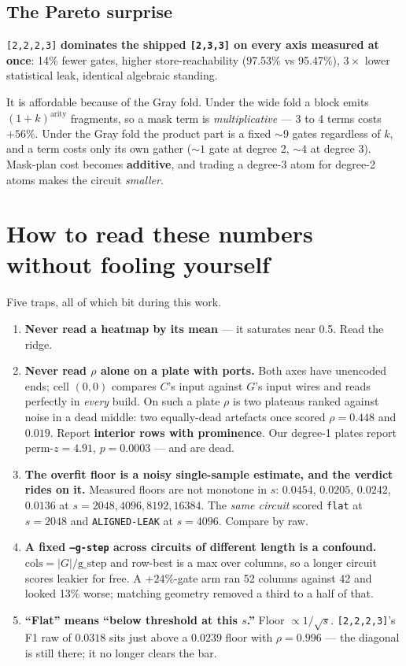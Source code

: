 \documentclass[11pt]{article}
\newcommand{\code}[1]{\texttt{#1}}
\begin{document}
\subsection{The Pareto surprise}

\code{[2,2,2,3]} \textbf{dominates the shipped \code{[2,3,3]} on every axis
measured at once}: 14\% fewer gates, higher store-reachability (97.53\% vs
95.47\%), $3\times$ lower statistical leak, identical algebraic standing.

It is affordable because of the Gray fold. Under the wide fold a block emits
$(1+k)^{\text{arity}}$ fragments, so a mask term is \emph{multiplicative} ---
3 to 4 terms costs $+56\%$. Under the Gray fold the product part is a fixed
${\sim}9$ gates regardless of $k$, and a term costs only its own gather
(${\sim}1$ gate at degree 2, ${\sim}4$ at degree 3). Mask-plan cost becomes
\textbf{additive}, and trading a degree-3 atom for degree-2 atoms makes the
circuit \emph{smaller}.

\section{How to read these numbers without fooling yourself}

Five traps, all of which bit during this work.

\begin{enumerate}
  \item \textbf{Never read a heatmap by its mean} --- it saturates near 0.5.
        Read the ridge.
  \item \textbf{Never read $\rho$ alone on a plate with ports.} Both axes have
        unencoded ends; cell $(0,0)$ compares $C$'s input against $G$'s input
        wires and reads perfectly in \emph{every} build. On such a plate $\rho$
        is two plateaus ranked against noise in a dead middle: two equally-dead
        artefacts once scored $\rho = 0.448$ and $0.019$. Report \textbf{interior
        rows with prominence}. Our degree-1 plates report perm-$z = 4.91$,
        $p = 0.0003$ --- and are dead.
  \item \textbf{The overfit floor is a noisy single-sample estimate, and the
        verdict rides on it.} Measured floors are not monotone in $s$: $0.0454$,
        $0.0205$, $0.0242$, $0.0136$ at $s = 2048, 4096, 8192, 16384$. The
        \emph{same circuit} scored \code{flat} at $s{=}2048$ and
        \code{ALIGNED-LEAK} at $s{=}4096$. Compare by raw.
  \item \textbf{A fixed \code{--g-step} across circuits of different length is a
        confound.} $\text{cols} = |G|/\text{g\_step}$ and row-best is a max over
        columns, so a longer circuit scores leakier for free. A $+24\%$-gate arm
        ran 52 columns against 42 and looked 13\% worse; matching geometry
        removed a third to a half of that.
  \item \textbf{``Flat'' means ``below threshold at this $s$.''} Floor
        $\propto 1/\sqrt{s}$. \code{[2,2,2,3]}'s F1 raw of $0.0318$ sits just
        above a $0.0239$ floor with $\rho = 0.996$ --- the diagonal is still
        there; it no longer clears the bar.
\end{enumerate}
\end{document}
